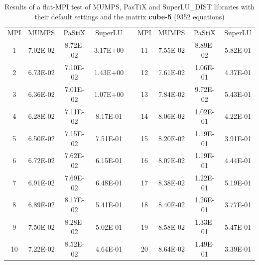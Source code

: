 \begin{table}[ht]
\centering
\begin{tabular}{|c|c|c|c|l|c|c|c|c|}
\cline{1-4} \cline{6-9}
MPI & MUMPS    & PaStiX   & SuperLU  &  & MPI & MUMPS    & PaStiX   & SuperLU  \\ \cline{1-4} \cline{6-9} 
1   & 7.02E-02 & 8.72E-02 & 3.17E+00 &  & 11  & 7.55E-02 & 8.89E-02 & 5.82E-01 \\ \cline{1-4} \cline{6-9} 
2   & 6.73E-02 & 7.10E-02 & 1.43E+00 &  & 12  & 7.61E-02 & 1.06E-01 & 4.37E-01 \\ \cline{1-4} \cline{6-9} 
3   & 6.36E-02 & 7.01E-02 & 1.07E+00 &  & 13  & 7.84E-02 & 9.72E-02 & 5.43E-01 \\ \cline{1-4} \cline{6-9} 
4   & 6.28E-02 & 7.11E-02 & 8.17E-01 &  & 14  & 8.06E-02 & 1.02E-01 & 4.22E-01 \\ \cline{1-4} \cline{6-9} 
5   & 6.50E-02 & 7.15E-02 & 7.51E-01 &  & 15  & 8.20E-02 & 1.19E-01 & 3.91E-01 \\ \cline{1-4} \cline{6-9} 
6   & 6.72E-02 & 7.62E-02 & 6.15E-01 &  & 16  & 8.07E-02 & 1.19E-01 & 4.44E-01 \\ \cline{1-4} \cline{6-9} 
7   & 6.91E-02 & 7.69E-02 & 6.48E-01 &  & 17  & 8.38E-02 & 1.22E-01 & 5.19E-01 \\ \cline{1-4} \cline{6-9} 
8   & 6.89E-02 & 8.17E-02 & 5.41E-01 &  & 18  & 8.40E-02 & 1.26E-01 & 3.77E-01 \\ \cline{1-4} \cline{6-9} 
9   & 7.50E-02 & 8.28E-02 & 5.02E-01 &  & 19  & 8.58E-02 & 1.33E-01 & 5.47E-01 \\ \cline{1-4} \cline{6-9} 
10  & 7.22E-02 & 8.52E-02 & 4.64E-01 &  & 20  & 8.64E-02 & 1.49E-01 & 3.39E-01 \\ \cline{1-4} \cline{6-9} 
\end{tabular}
\caption{Results of a flat-MPI test of MUMPS, PasTiX and SuperLU\_DIST libraries with their default settings and the matrix \textbf{cube-5} (9352 equations)}
\label{table:lc-cube-5-result}
\end{table}


